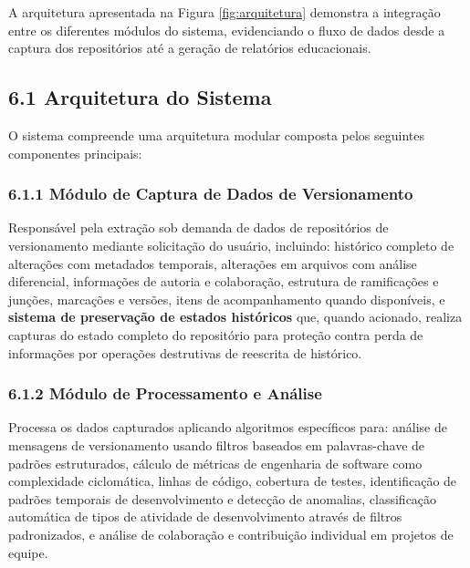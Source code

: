 \documentclass{patente}
\begin{document}

A arquitetura apresentada na Figura \ref{fig:arquitetura} demonstra a
integração entre os diferentes módulos do sistema, evidenciando o fluxo de
dados desde a captura dos repositórios até a geração de relatórios
educacionais.



\subsection*{6.1 Arquitetura do Sistema}
O sistema compreende uma arquitetura modular composta pelos seguintes
componentes principais:

\subsubsection*{6.1.1 Módulo de Captura de Dados de Versionamento}
Responsável pela extração sob demanda de dados de repositórios de versionamento mediante solicitação do usuário, incluindo: histórico completo de alterações com metadados temporais, alterações em arquivos com análise diferencial, informações de autoria e colaboração, estrutura de ramificações e junções, marcações e versões, itens de acompanhamento quando disponíveis, e \textbf{sistema de preservação de estados históricos} que, quando acionado, realiza capturas do estado completo do repositório para proteção contra perda de informações por operações destrutivas de reescrita de histórico.

\subsubsection*{6.1.2 Módulo de Processamento e Análise}
Processa os dados capturados aplicando algoritmos específicos para: análise de mensagens de versionamento usando filtros baseados em palavras-chave de padrões estruturados, cálculo de métricas de engenharia de software como complexidade ciclomática, linhas de código, cobertura de testes, identificação de padrões temporais de desenvolvimento e detecção de anomalias, classificação automática de tipos de atividade de desenvolvimento através de filtros padronizados, e análise de colaboração e contribuição individual em projetos de equipe.
\end{document}
